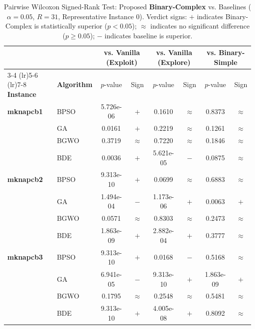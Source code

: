 \begin{table}[htbp]
  \centering
  \small
  \caption{Pairwise Wilcoxon Signed-Rank Test: Proposed \textbf{Binary-Complex} vs. Baselines ($\alpha=0.05$, $R=31$, Representative Instance 0). Verdict signs: $+$ indicates Binary-Complex is statistically superior ($p < 0.05$); $\approx$ indicates no significant difference ($p \ge 0.05$); $-$ indicates baseline is superior.}
  \label{tab:wilcoxon_inst0}
  \begin{tabular*}{\textwidth}{@{\extracolsep{\fill}}llcccccc@{}}
    \toprule
    & & \multicolumn{2}{c}{\textbf{vs. Vanilla (Exploit)}} & \multicolumn{2}{c}{\textbf{vs. Vanilla (Explore)}} & \multicolumn{2}{c}{\textbf{vs. Binary-Simple}} \\
    \cmidrule(lr){3-4} \cmidrule(lr){5-6} \cmidrule(lr){7-8}
    \textbf{Instance} & \textbf{Algorithm} & $p$-value & Sign & $p$-value & Sign & $p$-value & Sign \\
    \midrule
    \textbf{mknapcb1}  & BPSO  & 5.726e-06 & $+$ &    0.1610 & $\approx$ &    0.8373 & $\approx$ \\
                       & GA    &    0.0161 & $+$ &    0.2219 & $\approx$ &    0.1261 & $\approx$ \\
                       & BGWO  &    0.3719 & $\approx$ &    0.7220 & $\approx$ &    0.1846 & $\approx$ \\
                       & BDE   &    0.0036 & $+$ & 5.621e-05 & $-$ &    0.0875 & $\approx$ \\
    \midrule
    \textbf{mknapcb2}  & BPSO  & 9.313e-10 & $+$ &    0.0699 & $\approx$ &    0.6883 & $\approx$ \\
                       & GA    & 1.494e-04 & $-$ & 1.173e-06 & $+$ &    0.0063 & $+$ \\
                       & BGWO  &    0.0571 & $\approx$ &    0.8303 & $\approx$ &    0.2473 & $\approx$ \\
                       & BDE   & 1.863e-09 & $+$ & 2.882e-04 & $+$ &    0.3777 & $\approx$ \\
    \midrule
    \textbf{mknapcb3}  & BPSO  & 9.313e-10 & $+$ &    0.0168 & $-$ &    0.5168 & $\approx$ \\
                       & GA    & 6.941e-05 & $-$ & 9.313e-10 & $+$ & 1.863e-09 & $+$ \\
                       & BGWO  &    0.1795 & $\approx$ &    0.2548 & $\approx$ &    0.5481 & $\approx$ \\
                       & BDE   & 9.313e-10 & $+$ & 4.005e-08 & $+$ &    0.8092 & $\approx$ \\

\end{tabular*}
\end{table}
